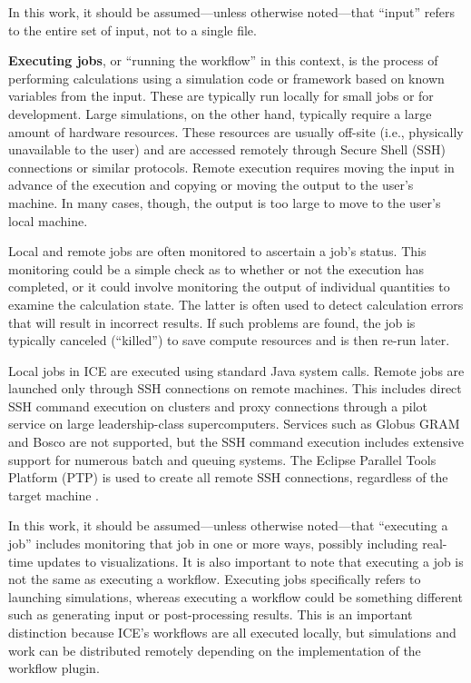 In this work, it should be assumed---unless otherwise noted---that
``input'' refers to the entire set of input, not to a single file.

\textbf{Executing jobs}, or ``running the workflow'' in this context, is
the process of performing calculations using a simulation code or
framework based on known variables from the input. These are typically run locally for small jobs or for development. Large
simulations, on the other hand, typically require a large amount of
hardware resources. These resources are usually off-site (i.e.,
physically unavailable to the user) and are accessed remotely
through Secure Shell (SSH) connections or similar protocols. Remote
execution requires moving the input in advance of the execution and
copying or moving the output to the user's machine. In many cases,
though, the output is too large to move to the user's local machine.

Local and remote jobs are often monitored to ascertain a job's status.
This monitoring could be a simple check as to whether or not the execution
has completed, or it could involve monitoring the output of individual
quantities to examine the calculation state. The latter is often used to
detect calculation errors that will result in incorrect results. If such
problems are found, the job is typically canceled (``killed'') to save
compute resources and is then re-run later.

Local jobs in ICE are executed using standard Java system calls. Remote jobs
are launched only through SSH connections on remote machines. This includes
direct SSH command execution on clusters and proxy connections through a pilot
service on large leadership-class supercomputers. Services such as Globus GRAM
and Bosco are not supported, but the SSH command execution includes extensive
support for numerous batch and queuing systems. The Eclipse Parallel Tools
Platform (PTP) is used to create all remote SSH connections, regardless of the
target machine \cite{tibbitts_integrated_2009}.

In this work, it should be assumed---unless otherwise noted---that
``executing a job'' includes monitoring that job in one or more ways,
possibly including real-time updates to visualizations. It is also important to
note that executing a job is not the same as executing a workflow. Executing
jobs specifically refers to launching simulations, whereas executing a workflow
could be something different such as generating input or post-processing
results. This is an important distinction because ICE's workflows are all
executed locally, but simulations and work can be distributed remotely
depending on the implementation of the workflow plugin.

